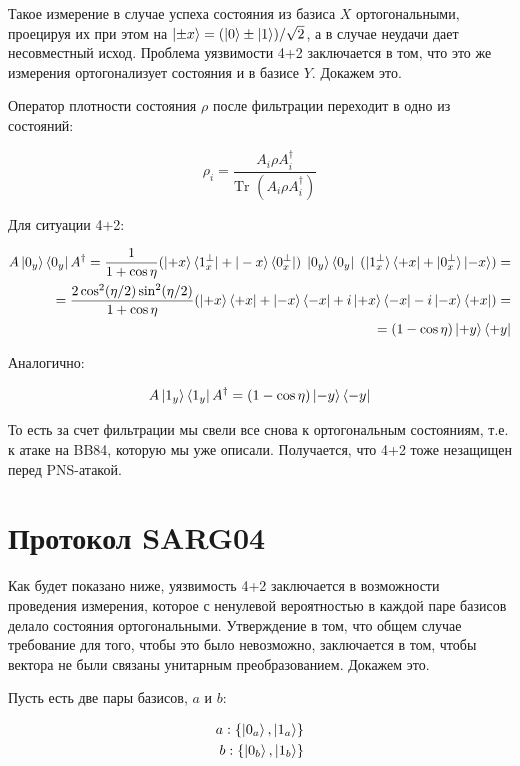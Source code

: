 \documentclass[a4paper, 12pt]{article}
\begin{document}
Такое измерение в случае успеха состояния из базиса $X$ ортогональными, проецируя их при этом на $\ket{\pm x} = (\ket{0} \pm \ket{1}) / \sqrt{2}$, а в случае неудачи дает несовместный исход. Проблема уязвимости 4+2 заключается в том, что это же измерения ортогонализует состояния и в базисе $Y$. Докажем это.

Оператор плотности состояния $\rho$ после фильтрации переходит в одно из состояний:

\begin{equation}
	\rho_i = \frac{A_i\rho A_i^\dagger}{\text{Tr }(A_i \rho A_i^\dagger)}
\end{equation}

Для ситуации 4+2:

\begin{align*}
	A\ket{0_y} \bra{0_y} A^\dagger = \frac{1}{1 + \cos\eta} (\ket{+x}\braket{1_x^\perp|+|-x} \bra{0_x^\perp}) \; \ket{0_y}\bra{0_y} \; (\ket{1_x^\perp} \braket{+x|+|0_x^\perp} \ket{-x}) = \\
	= \frac{2 \cos^2 (\eta/2) \sin^2 (\eta/2)}{1 + \cos \eta} (\ket{+x}\bra{+x} + \ket{-x} \bra{-x} + i\ket{+x}\bra{-x} - i\ket{-x}\bra{+x}) = \\
	= (1 - \cos \eta) \ket{+y} \bra{+y}
\end{align*}

Аналогично:

\begin{equation}
	A\ket{1_y}\bra{1_y} A^\dagger = (1 - \cos\eta) \ket{-y}\bra{-y}
\end{equation}

То есть за счет фильтрации мы свели все снова к ортогональным состояниям, т.е. к атаке на BB84, которую мы уже описали. Получается, что 4+2 тоже незащищен перед PNS-атакой.

\section{Протокол SARG04}

Как будет показано ниже, уязвимость 4+2 заключается в возможности проведения измерения, которое с ненулевой вероятностью в каждой паре базисов делало состояния ортогональными. Утверждение в том, что общем случае требование для того, чтобы это было невозможно, заключается в том, чтобы вектора не были связаны унитарным преобразованием. Докажем это.

Пусть есть две пары базисов, $a$ и $b$:

\begin{align}
	a : \{\ket{0_a}, \ket{1_a}\} \\
	b : \{\ket{0_b}, \ket{1_b}\}
\end{align}
\end{document}
